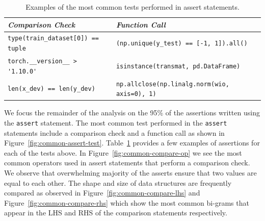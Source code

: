 
\begin{table}
  \centering
  \caption{Examples of the most common tests performed in assert statements.}
  \begin{tabular}{@{}m{} m{}@{}}
    \toprule
    \emph{\textbf{Comparison Check}}&
    \emph{\textbf{Function Call}}\\
    \midrule

    \lstinline[]$type(train_dataset[0]) == tuple$&
    \lstinline[]$(np.unique(y_test) == [-1, 1]).all()$\\

    \lstinline[]$torch.__version__ > '1.10.0'$&
    \lstinline[]$isinstance(transmat, pd.DataFrame)$\\

    \lstinline[]$len(x_dev) == len(y_dev)$&
    \lstinline[]$np.allclose(np.linalg.norm(wio, axis=0), 1)$\\
    \bottomrule
  \end{tabular}
  \label{tab:common-assert-test}
\end{table}

We focus the remainder of the analysis on the 95\% of the assertions written using the \lstinline{assert} statement. The most common test performed in the \lstinline{assert} statements include a comparison check and a function call as shown in Figure~\ref{fig:common-assert-test}. Table~\ref{tab:common-assert-test} provides a few examples of assertions for each of the tests above. In Figure~\ref{fig:common-compare-op} we see the most common operators used in assert statements that perform a comparison check. We observe that overwhelming majority of the asserts ensure that two values are equal to each other. The shape and size of data structures are frequently compared as observed in Figure~\ref{fig:common-compare-lhs} and Figure~\ref{fig:common-compare-rhs} which show the most common bi-grams that appear in the LHS and RHS of the comparison statements respectively.

